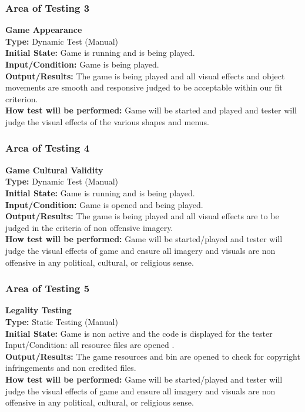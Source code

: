 \documentclass[12pt, titlepage]{article}
\begin{document}
\subsubsection{Area of Testing 3}
\noindent \textbf{Game Appearance} \\
\textbf{Type:} Dynamic Test (Manual) \\
\textbf{Initial State:} Game is running and is being played.\\
\textbf{Input/Condition:} Game is being played. \\
\textbf{Output/Results:} The game is being played and all visual effects and object movements are smooth and responsive judged to be acceptable within our fit criterion.\\
\textbf{How test will be performed:} Game will be started and played and tester will judge the visual effects of the various shapes and menus.

\subsubsection{Area of Testing 4}
\noindent \textbf{Game Cultural Validity}\\ 
\textbf{Type:} Dynamic Test (Manual) \\
\textbf{Initial State:} Game is running and is being played. \\
\textbf{Input/Condition:} Game is opened and being played. \\
\textbf{Output/Results:} The game is being played and all visual effects are to be judged in the criteria of non offensive imagery. \\
\textbf{How test will be performed:} Game will be started/played and tester will judge the visual effects of game and ensure all imagery and visuals are non offensive in any political, cultural, or religious sense.

\subsubsection{Area of Testing 5}
\noindent \textbf{Legality Testing}\\
\textbf{Type:} Static Testing (Manual)\\
\textbf{Initial State:} Game is non active and the code is displayed for the tester
Input/Condition: all resource files are opened . \\
\textbf{Output/Results:} The game resources and bin are opened to check for copyright infringements and non credited files.\\
\textbf{How test will be performed:} Game will be started/played and tester will judge the visual effects of game and ensure all imagery and visuals are non offensive in any political, cultural, or religious sense. 
\end{document}
